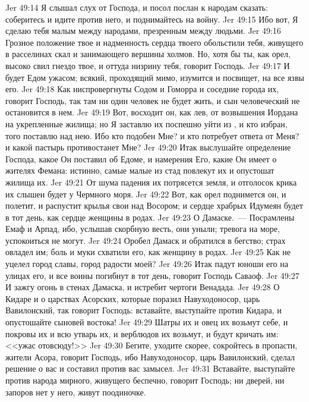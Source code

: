 \vs Jer 49:14 Я слышал слух от Господа, и посол послан к народам сказать: соберитесь и идите против него, и поднимайтесь на войну.
\vs Jer 49:15 Ибо вот, Я сделаю тебя малым между народами, презренным между людьми.
\vs Jer 49:16 Грозное положение твое и надменность сердца твоего обольстили тебя, живущего в расселинах скал и занимающего вершины холмов. Но, хотя бы ты, как орел, высоко свил гнездо твое, и оттуда низрину тебя, говорит Господь.
\vs Jer 49:17 И будет Едом ужасом; всякий, проходящий мимо, изумится и посвищет,  на все язвы его.
\vs Jer 49:18 Как ниспровергнуты Содом и Гоморра и соседние города их, говорит Господь, так  там ни один человек не будет жить, и сын человеческий не остановится в нем.
\vs Jer 49:19 Вот, восходит он, как лев, от возвышения Иордана на укрепленные жилища; но Я заставлю их поспешно уйти из , и кто избран, того поставлю над нею. Ибо кто подобен Мне? и кто потребует ответа от Меня? и какой пастырь противостанет Мне?
\vs Jer 49:20 Итак выслушайте определение Господа, какое Он поставил об Едоме, и намерения Его, какие Он имеет о жителях Фемана: истинно, самые малые из стад повлекут их и опустошат жилища их.
\vs Jer 49:21 От шума падения их потрясется земля, и отголосок крика их слышен будет у Чермного моря.
\vs Jer 49:22 Вот, как орел поднимется он, и полетит, и распустит крылья свои над Восором; и сердце храбрых Идумеян будет в тот день, как сердце женщины в родах.
\rsbpar\vs Jer 49:23 О Дамаске.~--- Посрамлены Емаф и Арпад, ибо, услышав скорбную весть, они уныли; тревога на море, успокоиться не могут.
\vs Jer 49:24 Оробел Дамаск и обратился в бегство; страх овладел им; боль и муки схватили его, как женщину в родах.
\vs Jer 49:25 Как не уцелел город славы, город радости моей?
\vs Jer 49:26 Итак падут юноши его на улицах его, и все воины погибнут в тот день, говорит Господь Саваоф.
\vs Jer 49:27 И зажгу огонь в стенах Дамаска, и истребит чертоги Венадада.
\rsbpar\vs Jer 49:28 О Кидаре и о царствах Асорских, которые поразил Навуходоносор, царь Вавилонский, так говорит Господь: вставайте, выступайте против Кидара, и опустошайте сыновей востока!
\vs Jer 49:29 Шатры их и овец их возьмут себе, и покровы их и всю утварь их, и верблюдов их возьмут, и будут кричать им: <<ужас отовсюду!>>
\vs Jer 49:30 Бегите, уходите скорее, сокройтесь в пропасти, жители Асора, говорит Господь, ибо Навуходоносор, царь Вавилонский, сделал решение о вас и составил против вас замысел.
\vs Jer 49:31 Вставайте, выступайте против народа мирного, живущего беспечно, говорит Господь; ни дверей, ни запоров нет у него, живут поодиночке.
